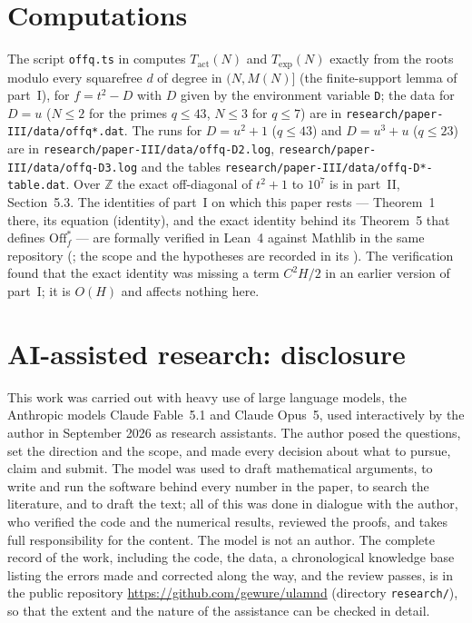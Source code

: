 \documentclass[11pt,a4paper]{article}
\theoremstyle{remark}\newtheorem{remark}[theorem]{Remark}
\newcommand{\Z}{\mathbb{Z}}\newcommand{\Q}{\mathbb{Q}}\newcommand{\F}{\mathbb{F}}\newcommand{\R}{\mathbb{R}}
\begin{document}
\appendix
\section{Computations}
The script \texttt{offq.ts} in  computes $T_{\mathrm{act}}(N)$ and $T_{\exp}(N)$ exactly
from the roots modulo every squarefree
$d$ of degree in $(N,M(N)]$ (the finite-support lemma of part~I), for $f=t^2-D$ with $D$ given by the environment
variable \texttt{D}; the data for $D=u$ ($N\le2$ for the primes $q\le43$, $N\le3$ for $q\le7$) are in
\texttt{research/paper-III/data/offq*.dat}. The runs for $D=u^2+1$ ($q\le43$) and $D=u^3+u$ ($q\le23$) are in
\texttt{research/paper-III/data/offq-D2.log}, \texttt{research/paper-III/data/offq-D3.log} and the tables \texttt{research/paper-III/data/offq-D*-table.dat}. Over $\Z$ the exact off-diagonal of $t^2+1$ to $10^7$ is in part~II,
Section~5.3. The identities of part~I on which this paper rests --- Theorem~1 there, its equation
(identity), and the exact identity behind its Theorem~5 that defines $\mathrm{Off}^\ast_f$ --- are formally
verified in Lean~4 against Mathlib in the same repository (; the
scope and the hypotheses are recorded in its ). The verification found that the exact
identity was missing a term $C^2H/2$ in an earlier version of part~I; it is $O(H)$ and affects nothing
here.

\section*{AI-assisted research: disclosure}
This work was carried out with heavy use of large language models, the Anthropic models Claude Fable~5.1 and
Claude Opus~5, used interactively by the author in September 2026 as research assistants. The author posed the questions, set the
direction and the scope, and made every decision about what to pursue, claim and submit. The model was used to draft
mathematical arguments, to write and run the software behind every number in the paper, to search the literature,
and to draft the text; all of this was done in dialogue with the author, who verified the code and the numerical
results, reviewed the proofs, and takes full responsibility for the content. The model is not an author. The
complete record of the work, including the code, the data, a chronological knowledge base listing the errors made
and corrected along the way, and the review passes, is in the public repository
\url{https://github.com/gewure/ulamnd} (directory \texttt{research/}), so that the extent and the nature of the
assistance can be checked in detail.



\end{document}
